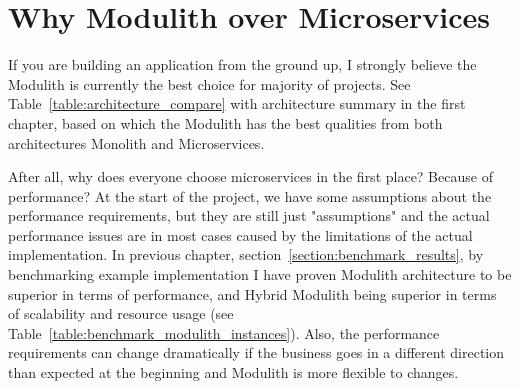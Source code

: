
\section{Why Modulith over Microservices}
\label{section:building_new_app}
If you are building an application from the ground up, I strongly believe the Modulith is currently the best choice for majority of projects. See Table~\ref{table:architecture_compare} with architecture summary in the first chapter, based on which the Modulith has the best qualities from both architectures Monolith and Microservices. 

After all, why does everyone choose microservices in the first place? Because of performance? At the start of the project, we have some assumptions about the performance requirements, but they are still just "assumptions" and the actual performance issues are in most cases caused by the limitations of the actual implementation. In previous chapter, section~\ref{section:benchmark_results}, by benchmarking example implementation I have proven Modulith architecture to be superior in terms of performance, and Hybrid Modulith being superior in terms of scalability and resource usage (see Table~\ref{table:benchmark_modulith_instances}). Also, the performance requirements can change dramatically if the business goes in a different direction than expected at the beginning and Modulith is more flexible to changes.

